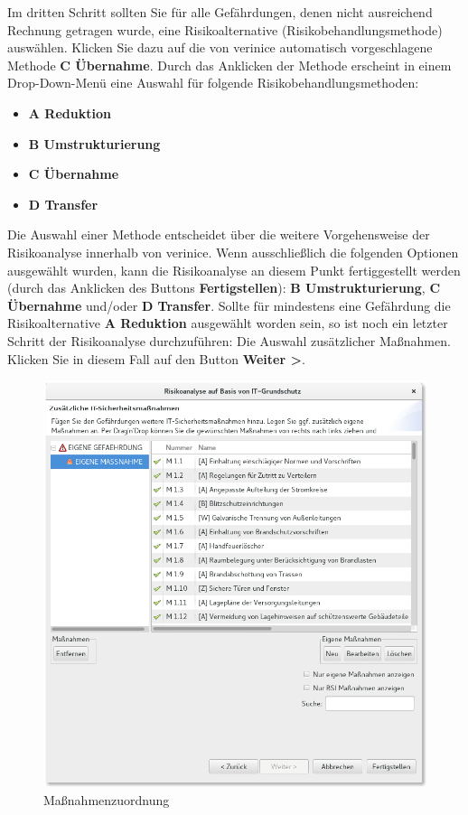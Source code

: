 \documentclass[a4paper,10pt]{book}
\begin{document}
\newline
Im dritten Schritt sollten Sie für alle Gefährdungen, denen nicht ausreichend Rechnung getragen wurde, eine  Risikoalternative (Risikobehandlungsmethode) auswählen. Klicken Sie dazu auf die von verinice automatisch vorgeschlagene Methode \textbf{C Übernahme}. Durch das Anklicken der Methode erscheint in einem Drop-Down-Menü eine Auswahl für folgende Risikobehandlungsmethoden:
\begin{itemize}
 \item{\textbf{A Reduktion}}
 \item{\textbf{B Umstrukturierung}}
 \item{\textbf{C Übernahme}}
 \item{\textbf{D Transfer}}
\end{itemize}
Die Auswahl einer Methode entscheidet über die weitere Vorgehensweise der Risikoanalyse innerhalb von verinice. Wenn ausschließlich die folgenden Optionen ausgewählt wurden, kann die Risikoanalyse an diesem Punkt fertiggestellt werden (durch das Anklicken des Buttons \textbf{Fertigstellen}): \textbf{B Umstrukturierung}, \textbf{C Übernahme} und/oder \textbf{D Transfer}. Sollte für mindestens eine Gefährdung die Risikoalternative \textbf{A Reduktion} ausgewählt worden sein, so ist noch ein letzter Schritt der Risikoanalyse durchzuführen: Die Auswahl zusätzlicher Maßnahmen. Klicken Sie in diesem Fall auf den Button \textbf{Weiter \textgreater}.
\newline
\begin{figure}[htb!]
  \centering
  \includegraphics[width=\textwidth]{Screenshot/Massnahmenzuordnung.png}
  \caption{\label{Massnahmenzuordnung} Maßnahmenzuordnung}
\end{figure}
\end{document}
